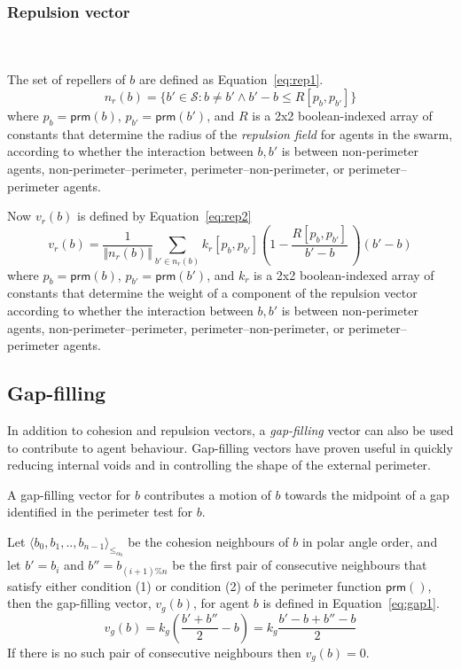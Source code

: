 \documentclass[12pt,a4paper]{IEEEtran}
\newcommand{\magn}[1]{\Vert{#1}\Vert}
\newcommand{\vbb}[2]{#2-#1}
\newcommand{\pangle}{\mathit{\alpha}}
\newcommand{\leqaz}[3]{#2 \leq_{\pangle_#1} #3}
\newcommand{\angleordered}[2]{\langle #2 \rangle_{\leqaz{#1}{}{}}}
\newcommand{\prm}{\mathsf{prm}}
\newcommand{\kr}{\mathit{k_r}}
\newcommand{\kg}{\mathit{k_g}}
\newcommand{\rb}{\mathit{R}}
\begin{document}
\subsubsection{Repulsion vector}~\\
~\\
The set of repellers of $b$ are defined as Equation~\ref{eq:rep1}.
\small
\begin{equation}\label{eq:rep1}
	n_r(b) = \{b' \in \mathcal{S} : b \neq b' \wedge \vbb{b}{b'} \leq \rb[p_b,p_{b'}]\}
\end{equation}
\normalsize
where $p_b = \prm(b)$, $p_{b'} = \prm(b')$, and $\rb$ is a 2x2 boolean-indexed
array of constants that determine the radius of the \emph{repulsion field} for
agents in the swarm, according to whether the interaction between $b,b'$ is
between non-perimeter agents, non-perimeter--perimeter,
perimeter--non-perimeter, or perimeter--perimeter agents.

Now $v_r(b)$ is defined by Equation~\ref{eq:rep2}
\small
\begin{equation}\label{eq:rep2}
	v_r(b) = \frac{1}{\magn{n_r(b)}}\sum_{b' \in n_r(b)} \kr[p_b,p_{b'}] \left(1 - \frac{\rb[p_b,p_{b'}]}{\vbb{b}{b'}} \, \right) (\vbb{b}{b'})
\end{equation}
\normalsize
where $p_b = \prm(b)$, $p_{b'} = \prm(b')$, and $\kr$ is a 2x2 boolean-indexed
array of constants that determine the weight of a component of the repulsion
vector according to whether the interaction between $b,b'$ is between
non-perimeter agents, non-perimeter--perimeter, perimeter--non-perimeter, or
perimeter--perimeter agents.

\subsection{Gap-filling}

In addition to cohesion and repulsion vectors, a \emph{gap-filling} vector can
also be used to contribute to agent behaviour. Gap-filling vectors have proven
useful in quickly reducing internal voids and in controlling the shape of the
external perimeter.

A gap-filling vector for $b$ contributes a motion of $b$ towards the midpoint
of a gap identified in the perimeter test for $b$.

Let $\angleordered{b}{b_0, b_1, .., b_{n-1}}$ be the cohesion neighbours of $b$
in polar angle order, and let $b' = b_i$  and $b'' = b_{(i+1)\%n}$ be the first
pair of consecutive neighbours that satisfy either condition (1) or condition
(2) of the perimeter function $\prm()$, then the gap-filling vector, $v_g(b)$,
for agent $b$ is defined in Equation~\ref{eq:gap1}.
\small
\begin{equation}\label{eq:gap1}
v_g(b) = \kg \left (\frac{b' + b''}{2} - b \right) = \kg \frac{\vbb{b}{b'} + \vbb{b}{b''}}{2} 
\end{equation}
\normalsize
If there is no such pair of consecutive neighbours then $v_g(b) = 0$.
\end{document}
